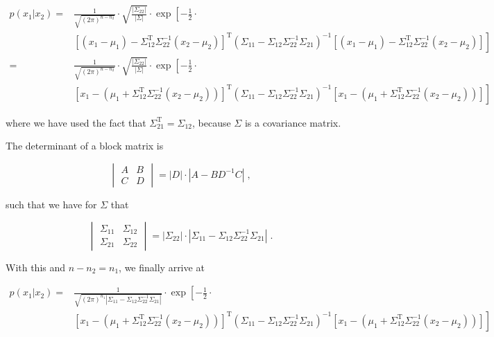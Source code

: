 \documentclass[a4paper,12pt,twoside]{book}
\begin{document}
\begin{equation} \label{eq:mvn-cond-mvn-cond-s8}
\begin{split}
p(x_1|x_2) = &\frac{1}{\sqrt{(2 \pi)^{n-n_2}}} \cdot \sqrt{\frac{|\Sigma_{22}|}{|\Sigma|}} \cdot \exp \left[ -\frac{1}{2} \cdot \right. \\
&\! \left. \left[ (x_1-\mu_1) - \Sigma_{12}^\mathrm{T} \Sigma_{22}^{-1} (x_2-\mu_2) \right]^\mathrm{T} (\Sigma_{11} - \Sigma_{12} \Sigma_{22}^{-1} \Sigma_{21})^{-1} \left[ (x_1-\mu_1) - \Sigma_{12}^\mathrm{T} \Sigma_{22}^{-1} (x_2-\mu_2) \right] \right] \\
= &\frac{1}{\sqrt{(2 \pi)^{n-n_2}}} \cdot \sqrt{\frac{|\Sigma_{22}|}{|\Sigma|}} \cdot \exp \left[ -\frac{1}{2} \cdot \right. \\
&\! \left. \left[ x_1 - \left( \mu_1 + \Sigma_{12}^\mathrm{T} \Sigma_{22}^{-1} (x_2-\mu_2) \right) \right]^\mathrm{T} (\Sigma_{11} - \Sigma_{12} \Sigma_{22}^{-1} \Sigma_{21})^{-1} \left[ x_1 - \left( \mu_1 + \Sigma_{12}^\mathrm{T} \Sigma_{22}^{-1} (x_2-\mu_2) \right) \right] \right]
\end{split}
\end{equation}

where we have used the fact that $\Sigma_{21}^\mathrm{T} = \Sigma_{12}$, because $\Sigma$ is a covariance matrix.

\vspace{1em}
The determinant of a block matrix is

\begin{equation} \label{eq:mvn-cond-Block-det}
\begin{vmatrix} A & B \\ C & D \end{vmatrix} = |D| \cdot | A - B D^{-1} C | \; ,
\end{equation}

such that we have for $\Sigma$ that

\begin{equation} \label{eq:mvn-cond-Sigma-det}
\begin{vmatrix} \Sigma_{11} & \Sigma_{12} \\ \Sigma_{21} & \Sigma_{22} \end{vmatrix} = |\Sigma_{22}| \cdot | \Sigma_{11} - \Sigma_{12} \Sigma_{22}^{-1} \Sigma_{21} | \; .
\end{equation}

With this and $n - n_2 = n_1$, we finally arrive at

\begin{equation} \label{eq:mvn-cond-mvn-cond-s9}
\begin{split}
p(x_1|x_2) = &\frac{1}{\sqrt{(2 \pi)^{n_1} | \Sigma_{11} - \Sigma_{12} \Sigma_{22}^{-1} \Sigma_{21} |}} \cdot \exp \left[ -\frac{1}{2} \cdot \right. \\
&\! \left. \left[ x_1 - \left( \mu_1 + \Sigma_{12}^\mathrm{T} \Sigma_{22}^{-1} (x_2-\mu_2) \right) \right]^\mathrm{T} (\Sigma_{11} - \Sigma_{12} \Sigma_{22}^{-1} \Sigma_{21})^{-1} \left[ x_1 - \left( \mu_1 + \Sigma_{12}^\mathrm{T} \Sigma_{22}^{-1} (x_2-\mu_2) \right) \right] \right]
\end{split}
\end{equation}
\end{document}
